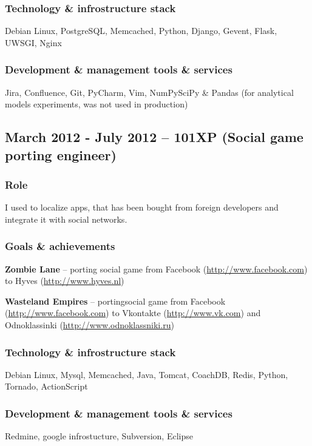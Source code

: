 \documentclass[9pt, a4paper, english]{extarticle}
\begin{document}
    \subsubsection* {Technology \& infrostructure stack}
      Debian Linux, PostgreSQL, Memcached, Python, Django, Gevent, Flask,
      UWSGI, Nginx
    \subsubsection* {Development \& management tools \& services}
      Jira, Confluence, Git, PyCharm, Vim, NumPy\/SciPy \& Pandas (for
      analytical models experiments, was not used in production)


  \subsection* {March 2012 - July 2012 -- \textbf{101XP} (Social game porting engineer)}
    \subsubsection* {Role}
      I used to localize apps, that has been bought from foreign developers and
      integrate it with social networks.
    \subsubsection* {Goals \& achievements}
      \begin {list}{\textbullet}{\itemsep=0mm}
        \item \textbf{Zombie Lane} -- porting social game from Facebook
          (\url{http://www.facebook.com}) to Hyves (\url{http://www.hyves.nl})
        \item \textbf{Wasteland Empires} -- portingsocial game from Facebook
          (\url{http://www.facebook.com}) to Vkontakte
          (\url{http://www.vk.com}) and Odnoklassinki
          (\url{http://www.odnoklassniki.ru})
      \end {list}
    \subsubsection* {Technology \& infrostructure stack}
      Debian Linux, Mysql, Memcached, Java, Tomcat, CoachDB, Redis, Python,
      Tornado, ActionScript
    \subsubsection* {Development \& management tools \& services}
      Redmine, google infrostucture, Subversion, Eclipse
\end{document}
